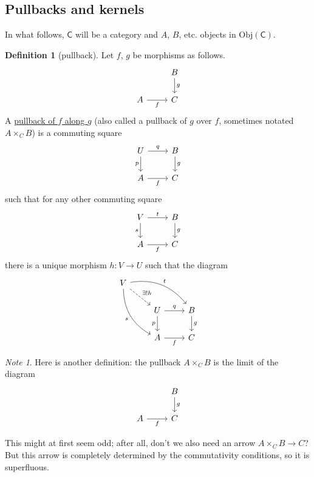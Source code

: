 \documentclass[a4paper]{report}
\newcommand{\defn}[1]{\ul{#1}}
\newcommand{\Obj}{\mathrm{Obj}}
\theoremstyle{definition}
\newtheorem{definition}{Definition}[section]
\theoremstyle{plain}
\theoremstyle{remark}
\newtheorem{note}{Note}[section]
\begin{document}
\subsection{Pullbacks and kernels}
In what follows, $\mathsf{C}$ will be a category and $A$, $B$, etc. objects in $\Obj(\mathsf{C})$.
\begin{definition}[pullback]
  \label{def:pullback}
  Let $f$, $g$ be morphisms as follows.
  \begin{equation*}
    \begin{tikzcd}
      & B \arrow[d, "g"] \\
      A \arrow[r, swap, "f"] & C
    \end{tikzcd}
  \end{equation*}
  A \defn{pullback of $f$ along $g$} (also called a pullback of $g$ over $f$, sometimes notated $A \times_{C} B$) is a commuting square 
  \begin{equation*}
    \begin{tikzcd}
      U \arrow[r, "q"] \arrow[d, "p", swap] & B \arrow[d, "g"] \\
      A \arrow[r, swap, "f"] & C
    \end{tikzcd}
  \end{equation*}
  such that for any other commuting square
  \begin{equation*}
    \begin{tikzcd}
      V \arrow[r, "t"] \arrow[d, "s", swap] & B \arrow[d, "g"] \\
      A \arrow[r, swap, "f"] & C
    \end{tikzcd}
  \end{equation*}
  there is a unique morphism $h\colon V \to U$ such that the diagram
  \begin{equation*}
    \begin{tikzcd}
      V \arrow[rrd, bend left, "t"] \arrow[rd, dashed, "\exists!h"] \arrow[rdd, bend right, swap, "s"] &   &  \\
      & U \arrow[r, "q"] \arrow[d, swap, "p"] & B \arrow[d, "g"] \\
      & A \arrow[r, swap, "f"] & C
    \end{tikzcd}
  \end{equation*}
\end{definition}
\begin{note}
  Here is another definition: the pullback $A \times_{C} B$ is the limit of the diagram
  \begin{equation*}
    \begin{tikzcd}
      & B
      \arrow[d, "g"]
      \\
      A
      \arrow[r, swap, "f"]
      & C
    \end{tikzcd}
  \end{equation*}

  This might at first seem odd; after all, don't we also need an arrow $A \times_{C} B \to C$? But this arrow is completely determined by the commutativity conditions, so it is superfluous.
\end{note}
\end{document}
